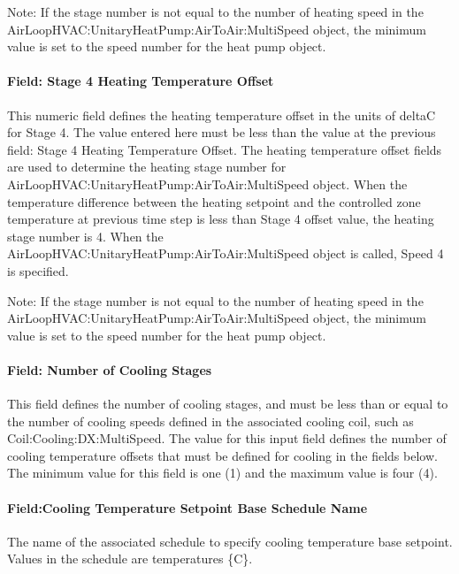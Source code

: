 Note: If the stage number is not equal to the number of heating speed in the AirLoopHVAC:UnitaryHeatPump:AirToAir:MultiSpeed object, the minimum value is set to the speed number for the heat pump object.

\paragraph{Field: Stage 4 Heating Temperature Offset}\label{field-stage-4-heating-temperature-offset}

This numeric field defines the heating temperature offset in the units of deltaC for Stage 4. The value entered here must be less than the value at the previous field: Stage 4 Heating Temperature Offset. The heating temperature offset fields are used to determine the heating stage number for AirLoopHVAC:UnitaryHeatPump:AirToAir:MultiSpeed object. When the temperature difference between the heating setpoint and the controlled zone temperature at previous time step is less than Stage 4 offset value, the heating stage number is 4. When the AirLoopHVAC:UnitaryHeatPump:AirToAir:MultiSpeed object is called, Speed 4 is specified.

Note: If the stage number is not equal to the number of heating speed in the AirLoopHVAC:UnitaryHeatPump:AirToAir:MultiSpeed object, the minimum value is set to the speed number for the heat pump object.

\paragraph{Field: Number of Cooling Stages}\label{field-number-of-cooling-stages}

This field defines the number of cooling stages, and must be less than or equal to the number of cooling speeds defined in the associated cooling coil, such as Coil:Cooling:DX:MultiSpeed. The value for this input field defines the number of cooling temperature offsets that must be defined for cooling in the fields below. The minimum value for this field is one (1) and the maximum value is four (4).

\paragraph{Field:Cooling Temperature Setpoint Base Schedule Name}\label{fieldcooling-temperature-setpoint-base-schedule-name}

The name of the associated schedule to specify cooling temperature base setpoint. Values in the schedule are temperatures \{C\}.

